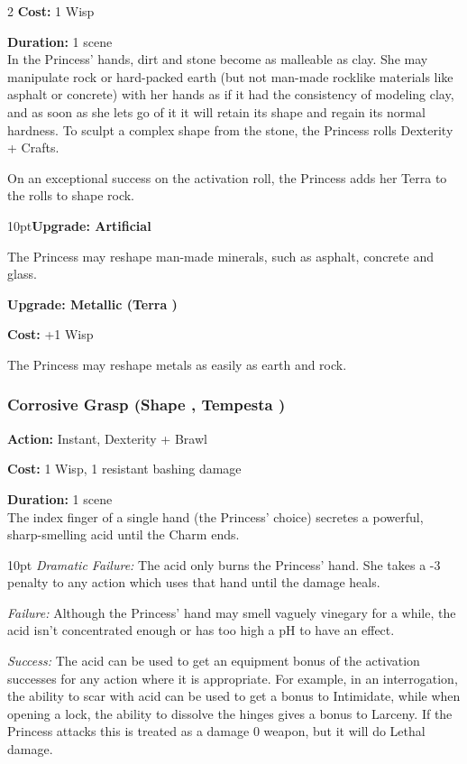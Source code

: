 \begin{multicols}{2}
\noindent \textbf{Cost:} 1 Wisp

\noindent \textbf{Duration:} 1 scene \\

\noindent In the Princess' hands, dirt and stone become as malleable as clay. She may manipulate rock or hard-packed earth (but not man-made rocklike materials like asphalt or concrete) with her hands as if it had the consistency of modeling clay, and as soon as she lets go of it it will retain its shape and regain its normal hardness. To sculpt a complex shape from the stone, the Princess rolls Dexterity + Crafts.

On an exceptional success on the activation roll, the Princess adds her Terra to the rolls to shape rock.
\begin{myindentpar}{10pt}\textbf{Upgrade: Artificial}

The Princess may reshape man-made minerals, such as asphalt, concrete and glass.

\textbf{Upgrade: Metallic (Terra \textbullet\textbullet)}

\noindent \textbf{Cost:} +1 Wisp

The Princess may reshape metals as easily as earth and rock.\end{myindentpar}

\subsubsection*{Corrosive Grasp (Shape \textbullet, Tempesta \textbullet)}

\noindent \textbf{Action:} Instant, Dexterity + Brawl

\noindent \textbf{Cost:} 1 Wisp, 1 resistant bashing damage

\noindent \textbf{Duration:} 1 scene \\

\noindent The index finger of a single hand (the Princess' choice) secretes a powerful, sharp-smelling acid until the Charm ends.

\begin{myindentpar}{10pt}    \emph{Dramatic Failure:} The acid only burns the Princess' hand. She takes a -3 penalty to any action which uses that hand until the damage heals.

    \emph{Failure:} Although the Princess' hand may smell vaguely vinegary for a while, the acid isn't concentrated enough or has too high a pH to have an effect.

    \emph{Success:} The acid can be used to get an equipment bonus of the activation successes for any action where it is appropriate. For example, in an interrogation, the ability to scar with acid can be used to get a bonus to Intimidate, while when opening a lock, the ability to dissolve the hinges gives a bonus to Larceny. If the Princess attacks this is treated as a damage 0 weapon, but it will do Lethal damage. 


\end{myindentpar}
\end{multicols}
